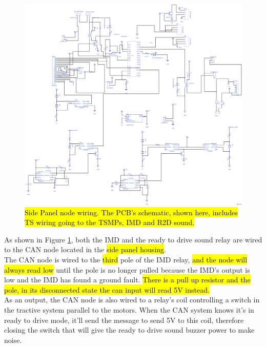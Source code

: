 \documentclass{article}
\DeclareRobustCommand{\hlr}[1]{{\sethlcolor{red}\hl{#1}}}
\begin{document}
            \begin{figure}
            \includegraphics[width=\textheight]{Panel-Board}
            \caption{\hlr{Side Panel node wiring. The PCB's schematic, shown here, includes TS wiring going to the TSMPs, IMD and R2D sound.}}
            \label{panelnode}
            \end{figure}

            As shown in Figure \ref{panelnode}, both the IMD and the ready to drive sound relay are wired to the CAN node located in the \hlr{side panel housing}.\\

            The CAN node is wired to the \hlr{third} pole of the IMD relay, \hlr{and the node will always read low }until the pole is no longer pulled because the IMD's output is low and the IMD has found a ground fault. \hlr{There is a pull up resistor and the pole, in its disconnected state the can input will read 5V instead.}\\

            As an output, the CAN node is also wired to a relay's coil controlling a switch in the tractive system parallel to the motors. When the CAN system knows it's in ready to drive mode, it'll send the message to send 5V to this coil, therefore closing the switch that will give the ready to drive sound buzzer power to make noise.\\
\end{document}
